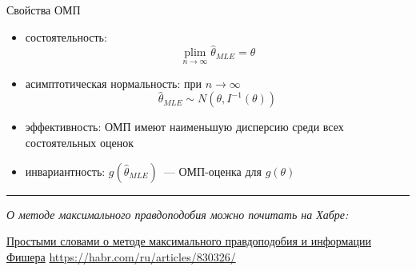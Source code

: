 \documentclass[11pt,pdf,utf8,hyperref={unicode},aspectratio=169]{beamer}
\DeclareMathOperator*{\plim}{\mathop{plim}}
\begin{document}
\begin{frame}{Свойства ОМП}
%
	\begin{itemize}
		\item состоятельность: $$\plim\limits_{n\rightarrow\infty} \hat{\theta}_{MLE}  = \theta$$
		\item асимптотическая нормальность: при $n\rightarrow \infty$ $$\hat{\theta}_{MLE}\sim N\left(\theta, I^{-1}(\theta)\right)$$
		\item эффективность: ОМП имеют наименьшую дисперсию среди всех состоятельных оценок
		\item инвариантность: $g\left(\hat{\theta}_{MLE}\right)$~--- ОМП-оценка для $g\left(\theta\right)$
	\end{itemize}

    \medskip
    \hrule

    \medskip

    \slshape
    \small
    О методе максимального правдоподобия можно почитать на Хабре:

    \raggedleft
    \href{https://habr.com/ru/articles/830326/}{Простыми словами о методе максимального правдоподобия и информации Фишера} \url{https://habr.com/ru/articles/830326/}
\end{frame}
\end{document}
